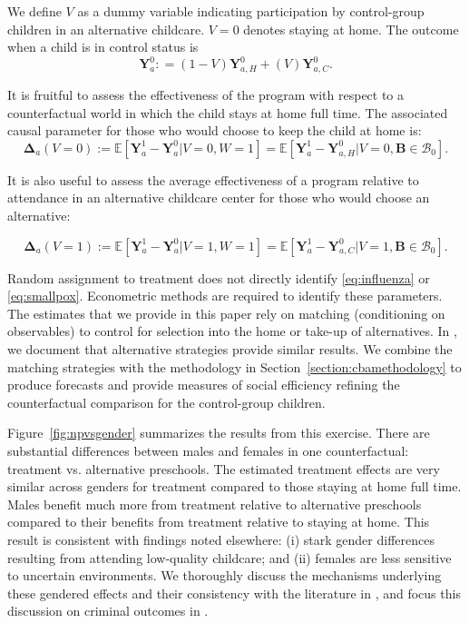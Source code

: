 We define $V$ as a dummy variable indicating participation by control-group children in an alternative childcare. $V=0$ denotes staying at home. The outcome when a child is in control status is
\begin{equation}
\bm{Y}^0_a : = \left( 1 - V \right) \bm{Y}^0_{a,H} + \left( V \right) \bm{Y}^0_{a,C}. \label{eq:meandiff}
\end{equation}

It is fruitful to assess the effectiveness of the program with respect to a counterfactual world in which the child stays at home full time. The associated causal parameter for those who would choose to keep the child at home is:
\begin{equation}\label{eq:influenza}
\bm{\Delta}_a \left(V = 0 \right) :=   \mathbb{E} \left[ \bm{Y}^1_a - \bm{Y}^0_a | V = 0, W = 1 \right] = \mathbb{E} \left[\bm{Y}^1_{a} - \bm{Y}^0_{a,H} | V = 0, \bm{B} \in \mathcal{B}_0 \right].
\end{equation}

It is also useful to assess the average effectiveness of a program relative to attendance in an alternative childcare center for those who would choose an alternative:

\begin{equation}\label{eq:smallpox}
\bm{\Delta}_a \left( V =1 \right) :=   \mathbb{E} \left[ \bm{Y}^1_a - \bm{Y}^0_a | V = 1, W = 1 \right] = \mathbb{E} \left[\bm{Y}^1_a - \bm{Y}^0_{a,C} | V = 1, \bm{B} \in \mathcal{B}_0 \right].
\end{equation}

Random assignment to treatment does not directly identify \eqref{eq:influenza} or \eqref{eq:smallpox}. Econometric methods are required to identify these parameters. The estimates that we provide in this paper rely on matching (conditioning on observables) to control for selection into the home or take-up of alternatives. In \citet{Garcia_Heckman_Ziff_2017_Gender-Diff_UNPUBLISHED}, we document that alternative strategies provide similar results. We combine the matching strategies with the methodology in Section~\ref{section:cbamethodology} to produce forecasts and provide measures of social efficiency refining the counterfactual comparison for the control-group children.

Figure~\ref{fig:npvsgender} summarizes the results from this exercise. There are substantial differences between males and females in one counterfactual: treatment vs. alternative preschools. The estimated treatment effects are very similar across genders for treatment compared to those staying at home full time. Males benefit much more from treatment relative to alternative preschools compared to their benefits from treatment relative to staying at home. This result is consistent with findings noted elsewhere: (i) stark gender differences resulting from attending low-quality childcare; and (ii) females are less sensitive to uncertain environments. We thoroughly discuss the mechanisms underlying these gendered effects and their consistency with the literature in \citet{Garcia_Heckman_Ziff_2017_Gender-Diff_UNPUBLISHED}, and focus this discussion on criminal outcomes in \citet{Garcia_etal_2019_ECE_IMHJ}.

